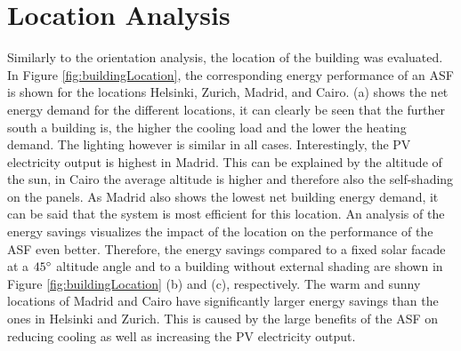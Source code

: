 \section{Location Analysis}

	Similarly to the orientation analysis, the location of the building was evaluated. In Figure \ref{fig:buildingLocation}, the corresponding energy performance of an ASF is shown for the locations Helsinki, Zurich, Madrid, and Cairo. (a) shows the net energy demand for the different locations, it can clearly be seen that the further south a building is, the higher the cooling load and the lower the heating demand. The lighting however is similar in all cases. Interestingly, the PV electricity output is highest in Madrid. This can be explained by the altitude of the sun, in Cairo the average altitude is higher and therefore also the self-shading on the panels. As Madrid also shows the lowest net building energy demand, it can be said that the system is most efficient for this location. An analysis of the energy savings visualizes the impact of the location on the performance of the ASF even better. Therefore, the energy savings compared to a fixed solar facade at a $45\degree$ altitude angle and to a building without external shading are shown in Figure \ref{fig:buildingLocation} (b) and (c), respectively. The warm and sunny locations of Madrid and Cairo have significantly larger energy savings than the ones in Helsinki and Zurich. This is caused by the large benefits of the ASF on reducing cooling as well as increasing the PV electricity output. 

